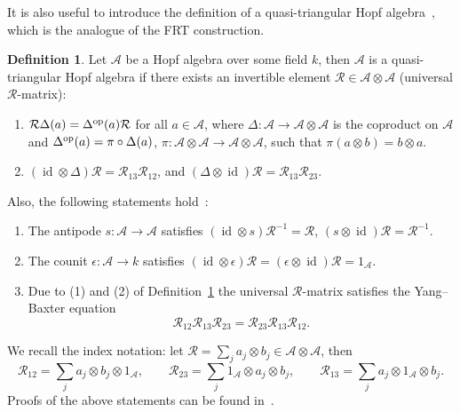 \documentclass[pdftex]{sigma}
\numberwithin{equation}{section}
\theoremstyle{definition}
\newtheorem{defn}[thm]{Definition}
\newcommand{\id}{\operatorname{id}}
\begin{document}
It is also useful to introduce the definition of a quasi-triangular Hopf algebra~\cite{Drinfeld, Drinfeld1, Drinfeld2}, which is the analogue of the FRT construction.
\begin{defn} \label{quasi}
Let $\mathcal{A}$ be a Hopf algebra over some field $k$, then $\mathcal{A}$ is a quasi-triangular Hopf algebra if there exists an invertible element ${\mathcal R} \in \mathcal{A}\otimes \mathcal{A}$ (universal ${\mathcal R}$-matrix):
\begin{enumerate}\itemsep=0pt
 \item ${\mathcal R} \Delta(a) =\Delta^{\rm op}(a) {\mathcal R}$ for all $a \in \mathcal{A}$,
 where $\Delta\colon \mathcal{A} \to \mathcal{A} \otimes \mathcal{A}$ is the coproduct on $\mathcal{A}$ and $\Delta^{\rm op}(a) = \pi \circ \Delta(a)$, $\pi\colon \mathcal{A} \otimes \mathcal{A} \to \mathcal{A} \otimes \mathcal{A}$, such that $\pi (a \otimes b) = b \otimes a$.
 \item $(\id \otimes \Delta){\mathcal R} = {\mathcal R}_{13} {\mathcal R}_{12}$, and $(\Delta \otimes \id){\mathcal R} = {\mathcal R}_{13} {\mathcal R}_{23}$.
\end{enumerate}
\end{defn}
Also, the following statements hold~\cite{Majid}:
\begin{enumerate}\itemsep=0pt
\item[{(a)}] The antipode
$s\colon \mathcal{A} \to \mathcal{A}$
satisfies $(\id \otimes s){\mathcal R}^{-1} = {\mathcal R}$,
$(s \otimes \id){\mathcal R} ={\mathcal R}^{-1}$.
\item[{(b)}] The counit $\epsilon\colon \mathcal{A} \to k$ satisfies $(\id \otimes \epsilon) {\mathcal R} = (\epsilon \otimes \id){\mathcal R} = 1_\mathcal{A}$.
\item[{(c)}] Due to (1) and (2) of Definition~\ref{quasi} the universal ${\mathcal R}$-matrix satisfies the Yang--Baxter equation
\begin{equation}
{\mathcal R}_{12} {\mathcal R}_{13} {\mathcal R}_{23} ={\mathcal R}_{23} {\mathcal R}_{13} {\mathcal R}_{12}. \label{UYBE}
\end{equation}
\end{enumerate}
We recall the index notation: let
${\mathcal R} = \sum_j a_j \otimes b_j \in \mathcal{A} \otimes \mathcal{A}$, then
\[
{\mathcal R}_{12} = \sum_j a_j \otimes b_j \otimes 1_\mathcal{A}, \qquad
{\mathcal R}_{23} = \sum_j 1_\mathcal{A} \otimes a_j \otimes b_j,\qquad
{\mathcal R}_{13} = \sum_j a_j \otimes 1_\mathcal{A} \otimes b_j.
\]
Proofs of the above statements can be found in~\cite{Chari, Majid}.
\end{document}
